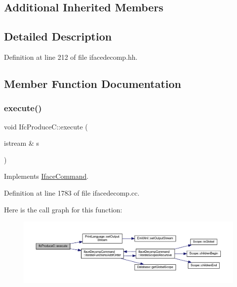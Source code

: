\subsection*{Additional Inherited Members}


\subsection{Detailed Description}


Definition at line 212 of file ifacedecomp.\+hh.



\subsection{Member Function Documentation}
\mbox{\label{class_ifc_produce_c_a45af16c6237ea8ff52caa3a7f655cb16}} 
\subsubsection{\texorpdfstring{execute()}{execute()}}
{\footnotesize\ttfamily void Ifc\+Produce\+C\+::execute (\begin{DoxyParamCaption}\item[{istream \&}]{s }\end{DoxyParamCaption})\hspace{0.3cm}{\ttfamily [virtual]}}



Implements \mbox{\hyperlink{class_iface_command_af10e29cee2c8e419de6efe9e680ad201}{Iface\+Command}}.



Definition at line 1783 of file ifacedecomp.\+cc.

Here is the call graph for this function\+:
\nopagebreak
\begin{figure}[H]
\begin{center}
\leavevmode
\includegraphics[width=350pt]{class_ifc_produce_c_a45af16c6237ea8ff52caa3a7f655cb16_cgraph}
\end{center}
\end{figure}
\mbox{\label{class_ifc_produce_c_ae7aa419deb8e0f730e574b40ac69b2d7}} 
